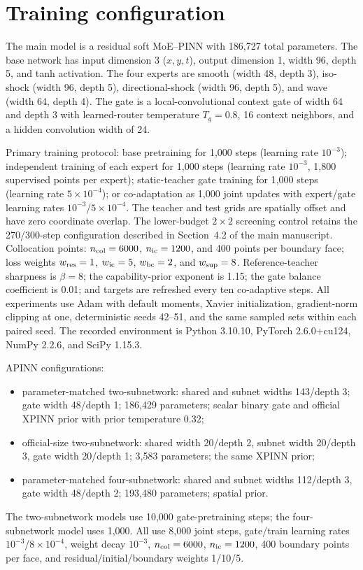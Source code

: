 \documentclass[preprint,12pt]{elsarticle}
\begin{document}
\section{Training configuration}
\label{app:config}

The main model is a residual soft MoE--PINN with 186,727 total parameters.
The base network has input dimension 3 ($x,y,t$), output dimension 1, width 96, depth 5, and tanh activation.
The four experts are smooth (width 48, depth 3), iso-shock (width 96, depth 5),
directional-shock (width 96, depth 5), and wave (width 64, depth 4).
The gate is a local-convolutional context gate of width 64 and depth 3 with learned-router temperature $T_g=0.8$,
16 context neighbors, and a hidden convolution width of 24.

Primary training protocol: base pretraining for 1,000 steps (learning rate $10^{-3}$);
independent training of each expert for 1,000 steps (learning rate $10^{-3}$, 1,800 supervised points per expert);
static-teacher gate training for 1,000 steps (learning rate $5\times10^{-4}$);
or co-adaptation as 1,000 joint updates with expert/gate learning rates $10^{-3}$/$5\times10^{-4}$.
The teacher and test grids are spatially offset and have zero coordinate overlap. The lower-budget $2\times2$ screening control retains the 270/300-step configuration described in Section~4.2 of the main manuscript.
Collocation points: $n_{\rm col}=6000$, $n_{\rm ic}=1200$, and 400 points per boundary face;
loss weights $w_{\rm res}=1$, $w_{\rm ic}=5$, $w_{\rm bc}=2$, and $w_{\rm sup}=8$.
Reference-teacher sharpness is $\beta=8$; the capability-prior exponent is 1.15; the gate balance coefficient is 0.01; and targets are refreshed every ten co-adaptive steps. All experiments use Adam with default moments, Xavier initialization, gradient-norm clipping at one, deterministic seeds 42--51, and the same sampled sets within each paired seed. The recorded environment is Python 3.10.10, PyTorch 2.6.0+cu124, NumPy 2.2.6, and SciPy 1.15.3.

APINN configurations:
\begin{itemize}[nosep]
\item parameter-matched two-subnetwork: shared and subnet widths 143/depth 3; gate width 48/depth 1; 186,429 parameters; scalar binary gate and official XPINN prior with prior temperature 0.32;
\item official-size two-subnetwork: shared width 20/depth 2, subnet width 20/depth 3, gate width 20/depth 1; 3,583 parameters; the same XPINN prior;
\item parameter-matched four-subnetwork: shared and subnet widths 112/depth 3, gate width 48/depth 2; 193,480 parameters; spatial prior.
\end{itemize}
The two-subnetwork models use 10,000 gate-pretraining steps; the four-subnetwork model uses 1,000. All use 8,000 joint steps, gate/train learning rates $10^{-3}$/$8\times10^{-4}$, weight decay $10^{-3}$, $n_{\rm col}=6000$, $n_{\rm ic}=1200$, 400 boundary points per face, and residual/initial/boundary weights 1/10/5.
\end{document}
